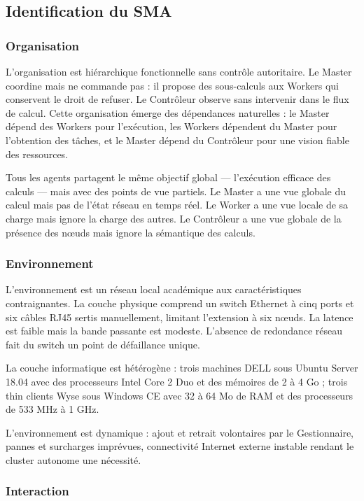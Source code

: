 \documentclass[12pt,a4paper]{report}
\begin{document}
\subsection{Identification du SMA}

\subsubsection{Organisation}

L'organisation est hiérarchique fonctionnelle sans contrôle autoritaire. Le Master coordine mais ne commande pas : il propose des sous-calculs aux Workers qui conservent le droit de refuser. Le Contrôleur observe sans intervenir dans le flux de calcul. Cette organisation émerge des dépendances naturelles : le Master dépend des Workers pour l'exécution, les Workers dépendent du Master pour l'obtention des tâches, et le Master dépend du Contrôleur pour une vision fiable des ressources.

Tous les agents partagent le même objectif global — l'exécution efficace des calculs — mais avec des points de vue partiels. Le Master a une vue globale du calcul mais pas de l'état réseau en temps réel. Le Worker a une vue locale de sa charge mais ignore la charge des autres. Le Contrôleur a une vue globale de la présence des nœuds mais ignore la sémantique des calculs.

\subsubsection{Environnement}

L'environnement est un réseau local académique aux caractéristiques contraignantes. La couche physique comprend un switch Ethernet à cinq ports et six câbles RJ45 sertis manuellement, limitant l'extension à six nœuds. La latence est faible mais la bande passante est modeste. L'absence de redondance réseau fait du switch un point de défaillance unique.

La couche informatique est hétérogène : trois machines DELL sous Ubuntu Server 18.04 avec des processeurs Intel Core 2 Duo et des mémoires de 2 à 4 Go ; trois thin clients Wyse sous Windows CE avec 32 à 64 Mo de RAM et des processeurs de 533 MHz à 1 GHz.

L'environnement est dynamique : ajout et retrait volontaires par le Gestionnaire, pannes et surcharges imprévues, connectivité Internet externe instable rendant le cluster autonome une nécessité.

\subsubsection{Interaction}
\end{document}
